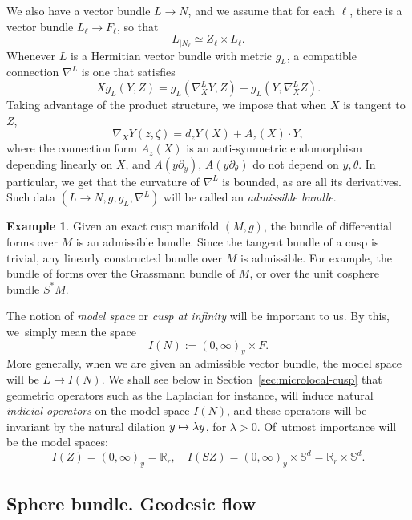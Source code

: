 \documentclass[JEP,XML,SOM,Unicode,NoFloatCountersInSection]{cedram}
\newcommand\mto{\mathchoice{\longmapsto}{\mapsto}{\mapsto}{\mapsto}}
\newcommand{\R}{\mathbb{R}}
\newcommand{\Ss}{\mathbb{S}}
\theoremstyle{plain}
\theoremstyle{definition}
\newtheorem{example}{Example}[section]
\begin{document}
We also have a vector bundle $L\to N$, and we assume that for each $\ell$, there is a vector bundle $L_\ell \to F_\ell$, so that
\[
L_{|N_\ell} \simeq Z_\ell \times L_\ell.
\]
Whenever $L$ is a Hermitian vector bundle with metric $g_L$, a compatible connection $\nabla^L$ is one that satisfies
\[
X g_L(Y,Z) = g_L(\nabla^L_X Y, Z) + g_L(Y, \nabla^L_X Z).
\]
Taking advantage of the product structure, we impose that when $X$ is tangent to $Z$,
\begin{equation}\label{eq:structure-connection}
\nabla_X Y(z,\zeta) = d_z Y(X)+ A_z(X)\cdot Y,
\end{equation}
where the connection form $A_z(X)$ is an anti-symmetric endomorphism depending linearly on $X$, and $A(y\partial_y)$, $A(y\partial_\theta)$ do not depend on $y,\theta$. In particular, we get that the curvature of $\nabla^L$ is bounded, as are all its derivatives. Such data $(L\to N, g, g_L,\nabla^L)$ will be called an \emph{admissible bundle}.

\begin{example}Given an exact cusp manifold $(M,g)$, the bundle of differential forms over $M$ is an admissible bundle. Since the tangent bundle of a cusp is trivial, any linearly constructed bundle over $M$ is admissible. For example, the bundle of forms over the Grassmann bundle of $M$, or over the unit cosphere bundle $S^\ast M$.
\end{example}

The notion of \emph{model space} or \emph{cusp at infinity} will be important to us. By this, we~simply mean the space
\[
I(N) := (0,\infty)_y \times F.
\]
More generally, when we are given an admissible vector bundle, the model space will be $L \to I(N)$. We shall see below in Section~\ref{sec:microlocal-cusp} that geometric operators such as the Laplacian for instance, will induce natural \emph{indicial operators} on the model space $I(N)$, and these operators will be invariant by the natural dilation $y \mto \lambda y$, for $\lambda > 0$. Of~utmost importance will be the model spaces:
\[
I(Z) = (0,\infty)_y = \R_r ,\quad I(SZ) = (0,\infty)_y \times \Ss^d = \R_r \times \Ss^d.
\]

\subsection{Sphere bundle. Geodesic flow}

\label{ssection:preliminaires-geo}
\end{document}
